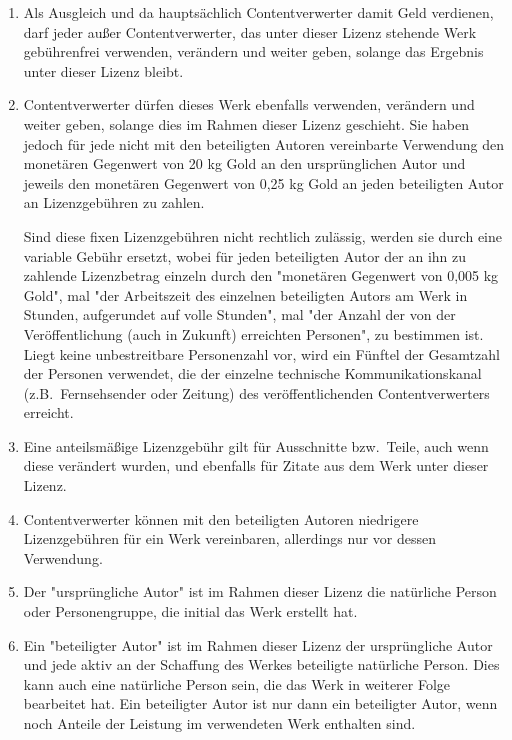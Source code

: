 \documentclass[a4paper,8pt]{extarticle}
\begin{document}
\begin{enumerate}
 \item Als Ausgleich und da hauptsächlich Contentverwerter damit Geld verdienen, darf jeder außer Contentverwerter, das unter dieser Lizenz stehende Werk gebührenfrei verwenden, verändern und weiter geben, solange das Ergebnis unter dieser Lizenz bleibt.

 \item \label{DEcosts} Contentverwerter dürfen dieses Werk ebenfalls verwenden, verändern und weiter geben, solange dies im Rahmen dieser Lizenz geschieht. Sie haben jedoch für jede nicht mit den beteiligten Autoren vereinbarte Verwendung den monetären Gegenwert von 20 kg Gold an den ursprünglichen Autor und jeweils den monetären Gegenwert von 0,25 kg Gold an jeden beteiligten Autor an Lizenzgebühren zu zahlen.
 
 Sind diese fixen Lizenzgebühren nicht rechtlich zulässig, werden sie durch eine variable Gebühr ersetzt, wobei für jeden beteiligten Autor der an ihn zu zahlende Lizenzbetrag einzeln durch den "monetären Gegenwert von 0,005 kg Gold", mal "der Arbeitszeit des einzelnen beteiligten Autors am Werk in Stunden, aufgerundet auf volle Stunden", mal "der Anzahl der von der Veröffentlichung (auch in Zukunft) erreichten Personen", zu bestimmen ist. Liegt keine unbestreitbare Personenzahl vor, wird ein Fünftel der Gesamtzahl der Personen verwendet, die der einzelne technische Kommunikationskanal (z.B.\ Fernsehsender oder Zeitung) des veröffentlichenden Contentverwerters erreicht.

 \item Eine anteilsmäßige Lizenzgebühr gilt für Ausschnitte bzw.\ Teile, auch wenn diese verändert wurden, und ebenfalls für Zitate aus dem Werk unter dieser Lizenz.

 \item Contentverwerter können mit den beteiligten Autoren niedrigere Lizenzgebühren für ein Werk vereinbaren, allerdings nur vor dessen Verwendung.

 \item Der "ursprüngliche Autor" ist im Rahmen dieser Lizenz die natürliche Person oder Personengruppe, die initial das Werk erstellt hat.

 \item Ein "beteiligter Autor" ist im Rahmen dieser Lizenz der ursprüngliche Autor und jede aktiv an der Schaffung des Werkes beteiligte natürliche Person. Dies kann auch eine natürliche Person sein, die das Werk in weiterer Folge bearbeitet hat. Ein beteiligter Autor ist nur dann ein beteiligter Autor, wenn noch Anteile der Leistung im verwendeten Werk enthalten sind.


\end{enumerate}
\end{document}
